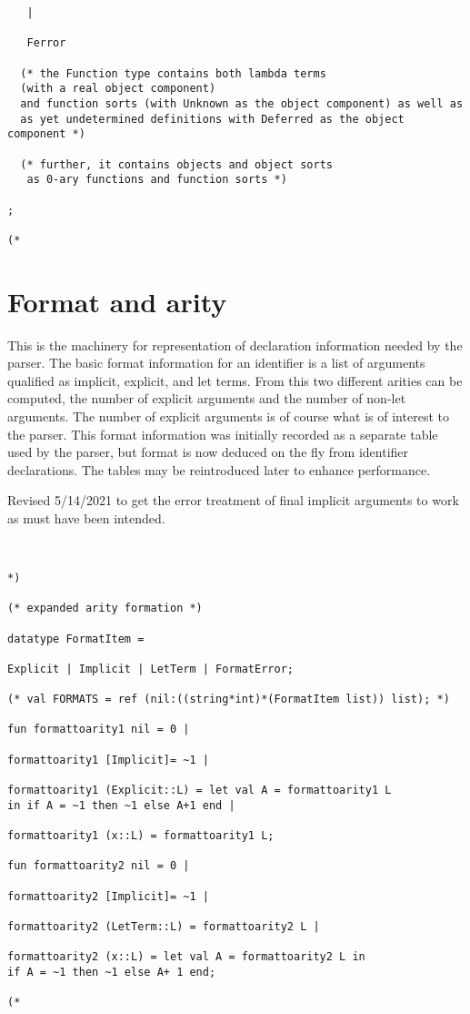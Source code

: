 \documentclass[12pt]{article}
\begin{document}
\begin{verbatim}
   |

   Ferror

  (* the Function type contains both lambda terms 
  (with a real object component)
  and function sorts (with Unknown as the object component) as well as
  as yet undetermined definitions with Deferred as the object component *)

  (* further, it contains objects and object sorts
   as 0-ary functions and function sorts *)

;

(*

\end{verbatim}

\newpage

\section{Format and arity}

This is the machinery for representation of declaration information needed by the parser.  The basic format information for
an identifier is a list of arguments qualified as implicit, explicit, and let terms.  From this two different arities can be computed, the
number of explicit arguments and the number of non-let arguments.  The number of explicit arguments is of course what is of interest
to the parser.  This format information was initially recorded as a separate table used by the parser, but format is now deduced on the fly from
identifier declarations.  The tables may be reintroduced later to enhance performance.

Revised 5/14/2021 to get the error treatment of final implicit arguments to work as must have been intended.


\begin{verbatim}


*)

(* expanded arity formation *)

datatype FormatItem =

Explicit | Implicit | LetTerm | FormatError;

(* val FORMATS = ref (nil:((string*int)*(FormatItem list)) list); *)

fun formattoarity1 nil = 0 |

formattoarity1 [Implicit]= ~1 |

formattoarity1 (Explicit::L) = let val A = formattoarity1 L 
in if A = ~1 then ~1 else A+1 end |

formattoarity1 (x::L) = formattoarity1 L;

fun formattoarity2 nil = 0 |

formattoarity2 [Implicit]= ~1 |

formattoarity2 (LetTerm::L) = formattoarity2 L |

formattoarity2 (x::L) = let val A = formattoarity2 L in
if A = ~1 then ~1 else A+ 1 end;

(*

\end{verbatim}
\end{document}
